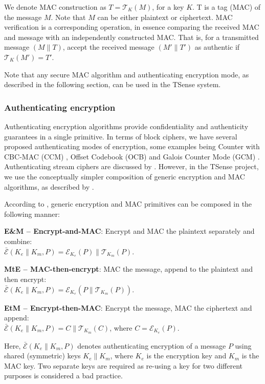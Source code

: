 We denote MAC construction as $T=\mathcal{T}_K(M)$, for a key $K$. T is a tag (MAC) of the message $M$. Note that $M$ can be either plaintext or ciphertext.
MAC verification is a corresponding operation, in essence comparing the received MAC and message with an independently constructed MAC. That is, for a transmitted message $(M \parallel T)$, accept the received message $(M' \parallel T')$ as authentic if $\mathcal{T}_K(M') = T'$.

Note that any secure MAC algorithm and authenticating encryption mode, as described in the following section, can be used in the TSense system.

\subsubsection{Authenticating encryption}
\label{sec:authenc}

Authenticating encryption algorithms provide confidentiality and authenticity guarantees in a single primitive. In terms of block ciphers, we have several proposed authenticating modes of encryption, some examples being Counter with CBC-MAC (CCM) , Offset Codebook (OCB)  and Galois Counter Mode (GCM) . Authenticating stream ciphers are discussed by . However, in the TSense project, we use the conceptually simpler composition of generic encryption and MAC algorithms, as described by .

According to , generic encryption and MAC primitives can be composed in the following manner:
%
\begin{description}
\item \textbf{E\&M -- Encrypt-and-MAC}: Encrypt and MAC the plaintext separately and combine:\\ $\bar{\mathcal{E}}(K_e \parallel K_m,P) = \mathcal{E}_{K_e}(P) \parallel \mathcal{T}_{K_m}(P)$.
\item \textbf{MtE -- MAC-then-encrypt}: MAC the message, append to the plaintext and then encrypt:\\ $\bar{\mathcal{E}}(K_e \parallel K_m,P) =\mathcal{E}_{K_e}(P \parallel \mathcal{T}_{K_m}(P))$.
\item \textbf{EtM -- Encrypt-then-MAC}: Encrypt the message, MAC the ciphertext and append:\\ $\bar{\mathcal{E}}(K_e \parallel K_m,P) = C \parallel \mathcal{T}_{K_m}(C)$, where $C=\mathcal{E}_{K_e}(P)$.
\end{description}
%
Here, $\bar{\mathcal{E}}(K_e \parallel K_m,P)$ denotes authenticating encryption of a message $P$ using shared (symmetric) keys $K_e \parallel K_m$, where $K_e$ is the encryption key and $K_m$ is the MAC key. Two separate keys are required as re-using a key for two different purposes is considered a bad practice.

